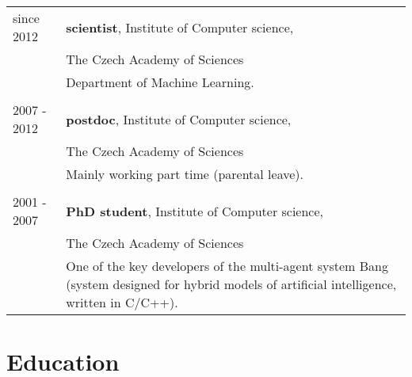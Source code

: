 \documentclass[a4paper, oneside, final]{scrartcl} %
\newcommand{\gray}{\rowcolor[gray]{.90}} %
\begin{document}
\begin{tabularx}{0.97\linewidth}{>{\raggedright}p{2cm}X}
  \gray since 2012 & \textbf{scientist},   Institute of Computer science, \\
  \gray & \hspace{1.6cm} The Czech Academy of Sciences \\
  & Department of Machine Learning.\\
  & \\
  \gray 2007 - 2012 & \textbf{postdoc}, Institute of Computer science, \\
  \gray & \hspace{1.5cm} The Czech Academy of Sciences \\
  & Mainly working part time (parental leave).\\
  &\\
  \gray 2001 - 2007 & \textbf{PhD student},   Institute of Computer science, \\
  \gray & \hspace{2.5cm} The Czech Academy of Sciences \\
  &  One of the key developers of the multi-agent system Bang (system designed for hybrid models of artificial intelligence, written in C/C++). \\
\end{tabularx}

\vspace{12pt}


\section{Education}
\end{document}
